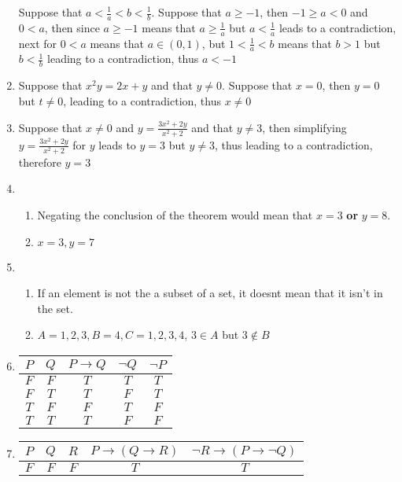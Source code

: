 \begin{enumerate}
    Suppose that $a < \frac{1}{a} < b < \frac{1}{b}$. Suppose that $a \geq -1$, then $-1 \geq a < 0$ and $0 < a$, then since $a \geq -1$ means that $a \geq \frac{1}{a}$ but $a < \frac{1}{a}$ leads to a contradiction, next for $0 < a$ means that $a \in (0,1)$, but $1 < \frac{1}{a} < b$ means that $b > 1$ but $b < \frac{1}{b}$ leading to a contradiction, thus $a < -1$
    \item 
    Suppose that $x^2y = 2x + y$ and that $y \neq 0$. Suppose that $x = 0$, then $y = 0$ but $t \neq 0$, leading to a contradiction, thus $x \neq 0$
    \item 
    Suppose that $x \neq 0$ and $y=\frac{3x^2+2y}{x^2+2}$ and that $y \neq 3$, then simplifying $y=\frac{3x^2+2y}{x^2+2}$ for $y$ leads to $y = 3$ but $y \neq 3$, thus leading to a contradiction, therefore $y = 3$
    \item 
    \begin{enumerate}
        \item Negating the conclusion of the theorem would mean that $x=3$ \textbf{or} $y=8$.
        \item $x=3, y=7$
    \end{enumerate}
    \item 
    \begin{enumerate}
        \item If an element is not the a subset of a set, it doesnt mean that it isn't in the set.
        \item $A={1,2,3}, B={4}, C={1,2,3,4}$, $3 \in A$ but $3 \notin B$
    \end{enumerate}
    \item 
    \begin{tabular}{c|c|c|c|c}
        $P$ & $Q$ & $P \rightarrow Q$ & $\lnot Q$ & $\lnot P$\\ \hline
        $F$ & $F$ & $T$ & $T$ & $T$ \\
        $F$ & $T$ & $T$ & $F$ & $T$ \\
        $T$ & $F$ & $F$ & $T$ & $F$ \\
        $T$ & $T$ & $T$ & $F$ & $F$ \\
    \end{tabular}
    \item
    \begin{tabular}{c|c|c|c|c}
        $P$ & $Q$ & $R$ & $P \rightarrow (Q \rightarrow R)$ & $\lnot R \rightarrow (P \rightarrow \lnot Q)$\\ \hline
        $F$ & $F$ & $F$ & $T$ & $T$ \\

\end{tabular}
\end{enumerate}
